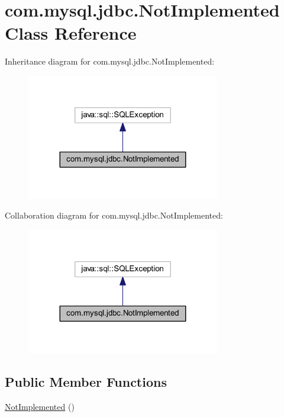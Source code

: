 \hypertarget{classcom_1_1mysql_1_1jdbc_1_1_not_implemented}{}\section{com.\+mysql.\+jdbc.\+Not\+Implemented Class Reference}
\label{classcom_1_1mysql_1_1jdbc_1_1_not_implemented}


Inheritance diagram for com.\+mysql.\+jdbc.\+Not\+Implemented\+:
\nopagebreak
\begin{figure}[H]
\begin{center}
\leavevmode
\includegraphics[width=239pt]{classcom_1_1mysql_1_1jdbc_1_1_not_implemented__inherit__graph}
\end{center}
\end{figure}


Collaboration diagram for com.\+mysql.\+jdbc.\+Not\+Implemented\+:
\nopagebreak
\begin{figure}[H]
\begin{center}
\leavevmode
\includegraphics[width=239pt]{classcom_1_1mysql_1_1jdbc_1_1_not_implemented__coll__graph}
\end{center}
\end{figure}
\subsection*{Public Member Functions}
\begin{DoxyCompactItemize}
\item 
\mbox{\hyperlink{classcom_1_1mysql_1_1jdbc_1_1_not_implemented_ad75f857caad109fdfc333191d251ea15}{Not\+Implemented}} ()
\end{DoxyCompactItemize}


